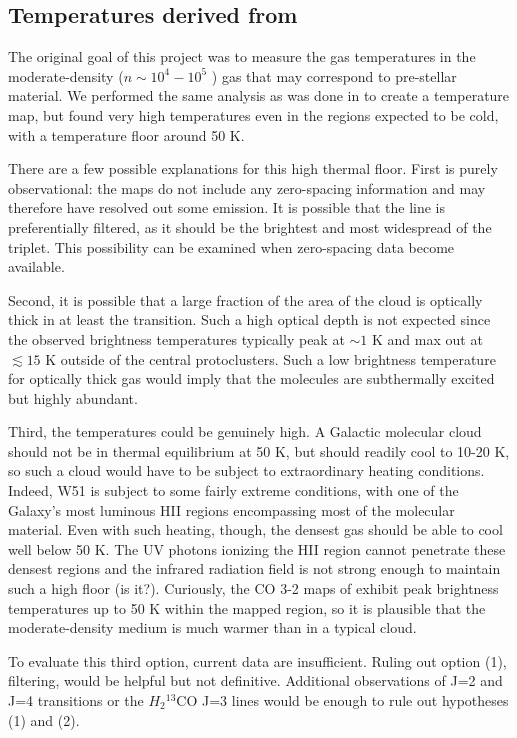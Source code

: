 \documentclass{aa}
\begin{document}
\clearpage

\subsection{Temperatures derived from \formaldehyde}
The original goal of this project was to measure the gas temperatures in the
moderate-density ($n\sim10^4-10^5$ \percc) gas that may correspond to
pre-stellar material.  We performed the same analysis as was done in \citet{Ginsburg2016a}
to create a \formaldehyde temperature map, but found very high temperatures even
in the regions expected to be cold, with a temperature floor around 50 K.

There are a few possible explanations for this high thermal floor.  First is
purely observational: the maps do not include any zero-spacing information and
may therefore have resolved out some emission.  It is possible that the
\threeohthree line is preferentially filtered, as it should be the brightest
and most widespread of the triplet.  This possibility can be examined when
zero-spacing data become available.

Second, it is possible that a large fraction of the area of the cloud is
optically thick in at least the \formaldehyde \threeohthree transition.  Such a
high optical depth is not expected since the observed brightness temperatures
typically peak at $\sim1$ K and max out at $\lesssim15$ K outside of the
central protoclusters.  Such a low brightness temperature for optically thick
gas would imply that the molecules are subthermally excited but highly
abundant.

Third, the temperatures could be genuinely high.  A Galactic molecular cloud
should not be in thermal equilibrium at 50 K, but should readily cool to 10-20
K, so such a cloud would have to be subject to extraordinary heating
conditions.  Indeed, W51 is subject to some fairly extreme conditions, with one
of the Galaxy's most luminous HII regions encompassing most of the molecular
material.  Even with such heating, though, the densest gas should be able to
cool well below 50 K.  The UV photons ionizing the HII region cannot penetrate
these densest regions and the infrared radiation field is not strong enough to
maintain such a high floor (is it?).  Curiously, the CO 3-2 maps of
\citet{Parsons2012a} exhibit peak brightness temperatures up to 50 K within the
mapped region, so it is plausible that the moderate-density medium is much
warmer than in a typical cloud.

To evaluate this third option, current data are insufficient.  Ruling out option (1),
filtering, would be helpful but not definitive.  Additional observations of J=2 and
J=4 \formaldehyde transitions or the $H_2$$^{13}$CO J=3 lines would be enough to rule
out hypotheses (1) and (2).
\end{document}
